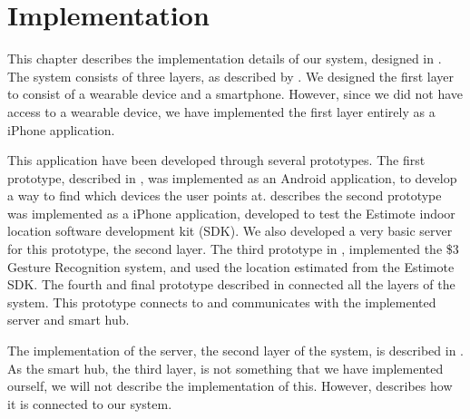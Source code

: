 \chapter{Implementation}\label{chap:implementation}
%
This chapter describes the implementation details of our system, 
designed in . 
The system consists of three layers, as described by .
We designed the first layer to consist of a wearable device and a smartphone. 
However, since we did not have access to a wearable device, 
we have implemented the first layer entirely as a iPhone application. 

This application have been developed through several prototypes. 
The first prototype, described in , was implemented as an Android application, 
to develop a way to find which devices the user points at. 
 describes the second prototype was implemented as a iPhone application,
developed to test the Estimote indoor location software development kit (SDK). 
We also developed a very basic server for this prototype, \ie the second layer. 
The third prototype in , 
implemented the \$3 Gesture Recognition system,
and used the location estimated from the Estimote SDK. 
The fourth and final prototype described in  connected all the layers of the system. 
This prototype connects to and communicates with the implemented server and smart hub. 

The implementation of the server, \ie the second layer of the system, 
is described in . 
As the smart hub, the third layer, is not something that we have implemented ourself, 
we will not describe the implementation of this.
However,  describes how it is connected to our system. 


\FloatBarrier

\FloatBarrier

\FloatBarrier

\FloatBarrier
